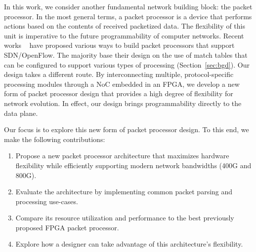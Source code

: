 In this work, we consider another fundamental network building block: the packet processor.
In the most general terms, a packet processor is a device that performs actions based on the contents of received packetized data.
The flexibility of this unit is imperative to the future programmability of computer networks.
Recent works ~\cite{attig2011400,bosshart2013forwarding,gibb2013design,naous2008implementing} have proposed various ways to build packet processors that support SDN/OpenFlow.
The majority base their design on the use of match tables that can be configured to support various types of processing (Section~\ref{sec:bgd}).
Our design takes a different route.
By interconnecting multiple, protocol-specific processing modules through a NoC embedded in an FPGA, we develop a new form of packet processor design that provides a high degree of flexibility for network evolution.
In effect, our design brings programmability directly to the data plane.

Our focus is to explore this new form of packet processor design. To this end, we make the following contributions:

\begin{enumerate}

\item Propose a new packet processor architecture that maximizes hardware flexibility while efficiently supporting modern network bandwidths (400G and 800G).
\item Evaluate the architecture by implementing common packet parsing and processing use-cases.
\item Compare its resource utilization and performance to the best previously proposed FPGA packet processor.
\item Explore how a designer can take advantage of this architecture's flexibility.

\end{enumerate}


%
%
